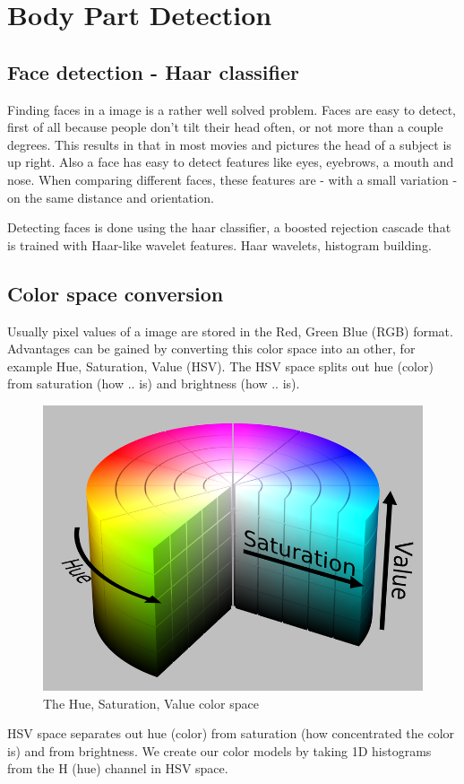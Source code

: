 \chapter{Body Part Detection}
\label{ch:bodyparts}


\section{Face detection - Haar classifier}
Finding faces in a image is a rather well solved problem. Faces are easy to detect, first of all because people don't tilt their head often, or not more than a couple degrees. This results in that in most movies and pictures the head of a subject is up right. Also a face has easy to detect features like eyes, eyebrows, a mouth and nose. When comparing different faces, these features are - with a small variation - on the same distance and orientation.

Detecting faces is done using the haar classifier, a  boosted rejection cascade that is trained with Haar-like wavelet features\cite{Lienhart02anextended}.
Haar wavelets, histogram building.


\section{Color space conversion}
Usually pixel values of a image are stored in the Red, Green Blue (RGB) format. Advantages can be gained by converting this color space into an other, for example Hue, Saturation, Value (HSV). The HSV space splits out hue (color) from saturation (how .. is) and brightness (how .. is).

\begin{figure}[htbp]
	\center
	\includegraphics[width=0.4\linewidth]{figures/hsv.png}
	\caption{The Hue, Saturation, Value color space}
	\label{fig:hsv}
\end{figure}



HSV space separates out hue (color) from saturation (how concentrated the color is) and from brightness. We create our color models by taking 1D histograms from the H (hue) channel in HSV space.


